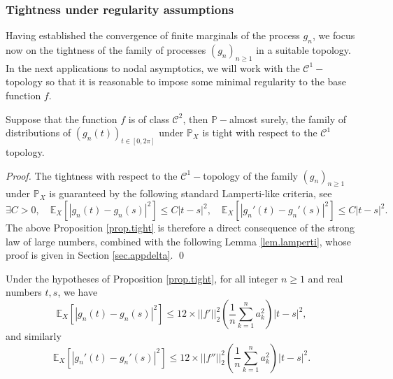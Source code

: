 \documentclass{svproc}
\newcommand{\Prob}{\mathbb{P}}
\begin{document}

\subsubsection{Tightness under regularity assumptions} \label{sec.tightness}
Having established the convergence of finite marginals of the process $g_n$, we focus now on the tightness of the family of processes $(g_n)_{n \geq 1}$ in a suitable topology. In the next applications to nodal asymptotics, we will work with the $\mathcal{C}^1-$topology so that it is reasonable to impose some minimal regularity to the base function $f$.

\begin{proposition}\label{prop.tight}
Suppose that the function $f$ is of class $\mathcal C^2$, then 
$\Prob-$almost surely, the family of distributions of $(g_n(t))_{t\in[0,2\pi]}$ under $\Prob_X$ is tight with respect to the $\mathcal{C}^1$ topology. 
\end{proposition}

\begin{proof}
The tightness with respect to the $\mathcal{C}^1-$topology of the family $(g_n)_{n \geq 1}$ under $\mathbb P_X$ is guaranteed by the following standard Lamperti-like criteria, see \cite{RS01}
\begin{equation}
\exists C>0, \quad \mathbb E_X[ |g_n(t)-g_n(s)|^2] \leq C |t-s|^2, \quad  \mathbb E_X[ |g_n'(t)-g_n'(s)|^2] \leq C |t-s|^2.
\end{equation}
The above Proposition \ref{prop.tight} is therefore a direct consequence of the strong law of large numbers, combined with the following Lemma \ref{lem.lamperti}, whose proof is given in Section \ref{sec.appdelta}. 
\qed
\end{proof}


\begin{lemma}\label{lem.lamperti}
Under the hypotheses of Proposition \ref{prop.tight}, for all integer $n \geq 1$ and real numbers $t,s$, we have
\[
 \mathbb E_X[ |g_n(t)-g_n(s)|^2] \leq 12 \times ||f'||_2^2  \left(  \frac{1}{n} \sum_{k=1}^n a_k^2 \right) |t-s|^2,
 \]
 and similarly 
 \[
 \mathbb E_X[ |g_n'(t)-g_n'(s)|^2] \leq 12 \times ||f''||_2^2  \left(  \frac{1}{n} \sum_{k=1}^n a_k^2 \right) |t-s|^2.
 \]
\end{lemma}
\end{document}
